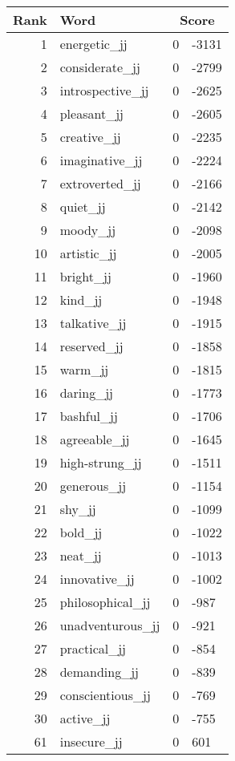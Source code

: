\begin{longtable}[!htbp]{| rlr@{.}l |}
    \hline
    \textbf{Rank} & \textbf{Word} & \multicolumn{2}{c|}{\textbf{Score}} \\
    \hline
    \endhead
    1 & energetic\_jj & 0 & -3131 \\
    2 & considerate\_jj & 0 & -2799 \\
    3 & introspective\_jj & 0 & -2625 \\
    4 & pleasant\_jj & 0 & -2605 \\
    5 & creative\_jj & 0 & -2235 \\
    6 & imaginative\_jj & 0 & -2224 \\
    7 & extroverted\_jj & 0 & -2166 \\
    8 & quiet\_jj & 0 & -2142 \\
    9 & moody\_jj & 0 & -2098 \\
    10 & artistic\_jj & 0 & -2005 \\
    11 & bright\_jj & 0 & -1960 \\
    12 & kind\_jj & 0 & -1948 \\
    13 & talkative\_jj & 0 & -1915 \\
    14 & reserved\_jj & 0 & -1858 \\
    15 & warm\_jj & 0 & -1815 \\
    16 & daring\_jj & 0 & -1773 \\
    17 & bashful\_jj & 0 & -1706 \\
    18 & agreeable\_jj & 0 & -1645 \\
    19 & high-strung\_jj & 0 & -1511 \\
    20 & generous\_jj & 0 & -1154 \\
    21 & shy\_jj & 0 & -1099 \\
    22 & bold\_jj & 0 & -1022 \\
    23 & neat\_jj & 0 & -1013 \\
    24 & innovative\_jj & 0 & -1002 \\
    25 & philosophical\_jj & 0 & -987 \\
    26 & unadventurous\_jj & 0 & -921 \\
    27 & practical\_jj & 0 & -854 \\
    28 & demanding\_jj & 0 & -839 \\
    29 & conscientious\_jj & 0 & -769 \\
    30 & active\_jj & 0 & -755 \\
    61 & insecure\_jj & 0 & 601 \\

\end{longtable}
